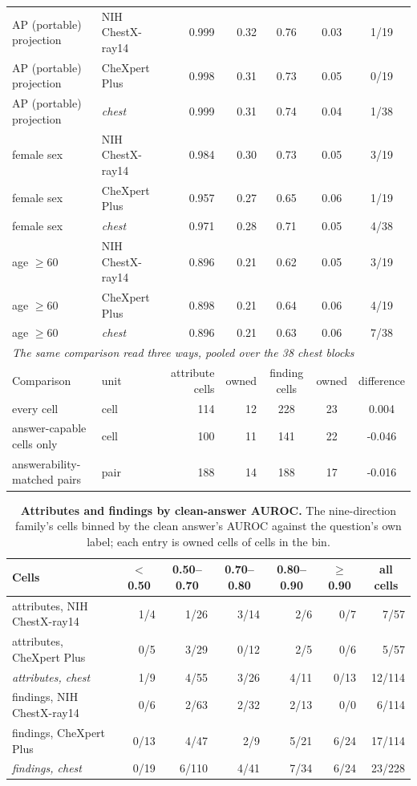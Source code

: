 \documentclass{article}
\begin{document}
\begin{table}[htbp]
\begin{tabular}{llrrccc}
\midrule
AP (portable) projection & NIH ChestX-ray14 & 0.999 & 0.32 & 0.76 & 0.03 & 1/19 \\
AP (portable) projection & CheXpert Plus & 0.998 & 0.31 & 0.73 & 0.05 & 0/19 \\
AP (portable) projection & \textit{chest} & 0.999 & 0.31 & 0.74 & 0.04 & 1/38 \\
female sex & NIH ChestX-ray14 & 0.984 & 0.30 & 0.73 & 0.05 & 3/19 \\
female sex & CheXpert Plus & 0.957 & 0.27 & 0.65 & 0.06 & 1/19 \\
female sex & \textit{chest} & 0.971 & 0.28 & 0.71 & 0.05 & 4/38 \\
age $\geq60$ & NIH ChestX-ray14 & 0.896 & 0.21 & 0.62 & 0.05 & 3/19 \\
age $\geq60$ & CheXpert Plus & 0.898 & 0.21 & 0.64 & 0.06 & 4/19 \\
age $\geq60$ & \textit{chest} & 0.896 & 0.21 & 0.63 & 0.06 & 7/38 \\
\midrule
\multicolumn{7}{l}{\textit{The same comparison read three ways, pooled over the 38 chest blocks}} \\
Comparison & unit & attribute cells & owned & finding cells & owned & difference \\
\midrule
every cell & cell & 114 & 12 & 228 & 23 & 0.004 \\
answer-capable cells only & cell & 100 & 11 & 141 & 22 & -0.046 \\
answerability-matched pairs & pair & 188 & 14 & 188 & 17 & -0.016 \\
\bottomrule
\end{tabular}
\end{table}
\begin{table}[t]
\centering
\small
\setlength{\tabcolsep}{4pt}
\caption{\textbf{Attributes and findings by clean-answer AUROC.} The nine-direction family's cells binned by the clean answer's AUROC against the question's own label; each entry is owned cells of cells in the bin.}
\label{tab:cf-attr-strat}
\begin{tabular}{lrrrrrr}
\toprule
Cells & \multicolumn{1}{c}{$<$ 0.50} & \multicolumn{1}{c}{0.50--0.70} & \multicolumn{1}{c}{0.70--0.80} & \multicolumn{1}{c}{0.80--0.90} & \multicolumn{1}{c}{$\geq$ 0.90} & \multicolumn{1}{c}{all cells}\\
\midrule
attributes, NIH ChestX-ray14 & 1/4 & 1/26 & 3/14 & 2/6 & 0/7 & 7/57 \\
attributes, CheXpert Plus & 0/5 & 3/29 & 0/12 & 2/5 & 0/6 & 5/57 \\
\textit{attributes, chest} & 1/9 & 4/55 & 3/26 & 4/11 & 0/13 & 12/114 \\
findings, NIH ChestX-ray14 & 0/6 & 2/63 & 2/32 & 2/13 & 0/0 & 6/114 \\
findings, CheXpert Plus & 0/13 & 4/47 & 2/9 & 5/21 & 6/24 & 17/114 \\
\textit{findings, chest} & 0/19 & 6/110 & 4/41 & 7/34 & 6/24 & 23/228 \\
\bottomrule
\end{tabular}
\end{table}
\end{document}
